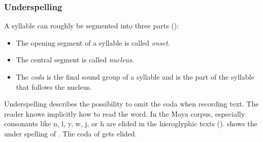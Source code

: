 \documentclass[../main.tex]{subfiles}
\begin{document}
\subsubsection{Underspelling}
A syllable can roughly be segmented into three parts (\cite[468]{crystal2008}):
\begin{itemize}
    \item The opening segment of a syllable is called \emph{onset}.
    \item The central segment is called \emph{nucleus}.
    \item The \emph{coda} is the final sound group of a syllable and is the part of the 
          syllable that follows the nucleus.
\end{itemize}
Underspelling describes the possibility to omit the coda when recording text.
The reader knows implicitly how to read the word.
In the Maya corpus, especially consonants like n, l, y, w, j, or h are elided 
in the hieroglyphic texts (\cite[143-144]{lawstuart2017}).
 shows the under spelling of .
The coda  of  gets elided.
\end{document}
